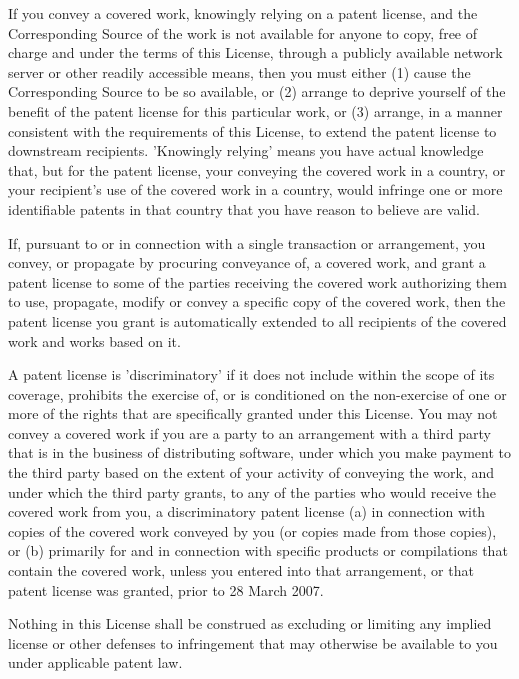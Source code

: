 \documentclass{article}
\begin{document}
  If you convey a covered work, knowingly relying on a patent license,
and the Corresponding Source of the work is not available for anyone
to copy, free of charge and under the terms of this License, through a
publicly available network server or other readily accessible means,
then you must either (1) cause the Corresponding Source to be so
available, or (2) arrange to deprive yourself of the benefit of the
patent license for this particular work, or (3) arrange, in a manner
consistent with the requirements of this License, to extend the patent
license to downstream recipients.  'Knowingly relying' means you have
actual knowledge that, but for the patent license, your conveying the
covered work in a country, or your recipient's use of the covered work
in a country, would infringe one or more identifiable patents in that
country that you have reason to believe are valid.

  If, pursuant to or in connection with a single transaction or
arrangement, you convey, or propagate by procuring conveyance of, a
covered work, and grant a patent license to some of the parties
receiving the covered work authorizing them to use, propagate, modify
or convey a specific copy of the covered work, then the patent license
you grant is automatically extended to all recipients of the covered
work and works based on it.

  A patent license is 'discriminatory' if it does not include within
the scope of its coverage, prohibits the exercise of, or is
conditioned on the non-exercise of one or more of the rights that are
specifically granted under this License.  You may not convey a covered
work if you are a party to an arrangement with a third party that is
in the business of distributing software, under which you make payment
to the third party based on the extent of your activity of conveying
the work, and under which the third party grants, to any of the
parties who would receive the covered work from you, a discriminatory
patent license (a) in connection with copies of the covered work
conveyed by you (or copies made from those copies), or (b) primarily
for and in connection with specific products or compilations that
contain the covered work, unless you entered into that arrangement,
or that patent license was granted, prior to 28 March 2007.

  Nothing in this License shall be construed as excluding or limiting
any implied license or other defenses to infringement that may
otherwise be available to you under applicable patent law.
\end{document}
